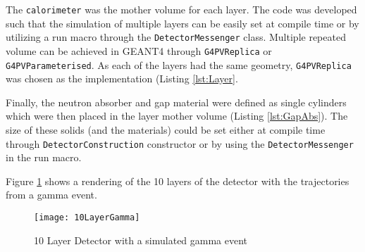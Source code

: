 The \verb+calorimeter+ was the mother volume for each layer. 
The code was developed such that the simulation of multiple layers can be easily set at compile time or by utilizing a run macro through the \verb+DetectorMessenger+ class.
Multiple repeated volume can be achieved in GEANT4 through \verb+G4PVReplica+ or \verb+G4PVParameterised+.
As each of the layers had the same geometry, \verb+G4PVReplica+ was chosen as the implementation (Listing \ref{lst:Layer}.

Finally, the neutron absorber and gap material were defined as single cylinders which were then placed in the layer mother volume (Listing \ref{lst:GapAbs}).
The size of these solids (and the materials) could be set either at compile time through \verb+DetectorConstruction+ constructor or by using the \verb+DetectorMessenger+ in the run macro.

Figure \ref{fig:LayerDetectorGeo} shows a rendering of the 10 layers of the detector with the trajectories from a gamma event.
\begin{figure} 
    \texttt{[image: 10LayerGamma]}
	\caption{10 Layer Detector with a simulated gamma event}
    \label{fig:LayerDetectorGeo}
\end{figure}

